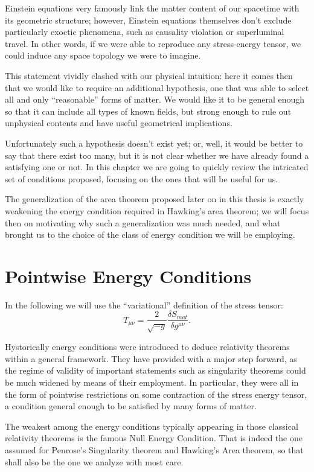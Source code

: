 Einstein equations very famously link the matter content of our spacetime with its geometric structure; however, Einstein equations themselves don't exclude particularly exoctic phenomena, such as causality violation or superluminal travel. In other words, if we were able to reproduce any stress-energy tensor, we could induce any space topology we were to imagine.

This statement vividly clashed with our physical intuition: here it comes then that we would like to require an additional hypothesis, one that was able to select all and only ``reasonable'' forms of matter. We would like it to be general enough so that it can include all types of known fields, but strong enough to rule out unphysical contents and have useful geometrical implications.

Unfortunately such a hypothesis doesn't exist yet; or, well, it would be better to say that there exist too many, but it is not clear whether we have already found a satisfying one or not. In this chapter we are going to quickly review the intricated set of conditions proposed, focusing on the ones that will be useful for us. 

The generalization of the area theorem proposed later on in this thesis is exactly weakening the energy condition required in Hawking's area theorem; we will focus then on motivating why such a generalization was much needed, and what brought us to the choice of the class of energy condition we will be employing.

\section{Pointwise Energy Conditions}
\label{sec:pointwise-energy-conditions}

In the following we will use the ``variational'' definition of the stress tensor:
\[
   T_{\mu\nu} = \frac{2}{\sqrt{-g}} \frac{\delta S_{mat}}{\delta g^{\mu\nu}}. 
\]

Hystorically energy conditions were introduced to deduce relativity theorems within a general framework. They have provided with a major step forward, as the regime of validity of important statements such as singularity theorems could be much widened by means of their employment. 
In particular, they were all in the form of pointwise restrictions on some contraction of the stress energy tensor, a condition general enough to be satisfied by many forms of matter.

The weakest among the energy conditions typically appearing in those classical relativity theorems is the famous Null Energy Condition. That is indeed the one assumed for Penrose's Singularity theorem and Hawking's Area theorem, so that shall also be the one we analyze with most care.

